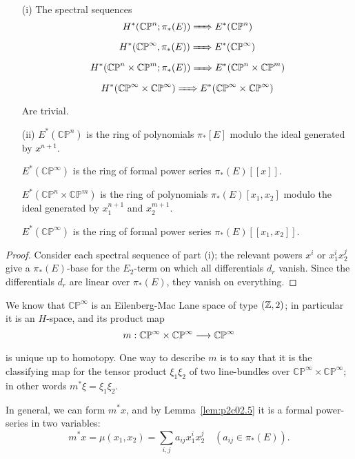 \documentclass[../main]{subfiles}
\begin{document}
\begin{customlemma}{2.5}
\label{lem:p2c02.5}
\begin{enumerate}
    \item[(i)] The spectral sequences \[H^\ast(\mathbb {CP}^n; \pi_\ast(E)) \xRightarrow{\phantom{.....}} E^\ast(\mathbb {CP}^n)\]
    \[H^\ast(\mathbb {CP}^\infty, \pi_\ast(E))  \xRightarrow{\phantom{.....}} E^\ast(\mathbb {CP}^\infty)\]
    \[H^\ast(\mathbb {CP}^n \times \mathbb {CP}^m; \pi_\ast(E))  \xRightarrow{\phantom{.....}} E^\ast(\mathbb {CP}^n \times \mathbb {CP}^m)\]
    \[H^\ast(\mathbb {CP}^\infty \times \mathbb {CP}^\infty)  \xRightarrow{\phantom{.....}} E^\ast(\mathbb {CP}^\infty \times \mathbb {CP}^\infty)\]
    Are trivial.
    \item[(ii)] $E^\ast(\mathbb {CP}^n)$ is the ring of polynomials $\pi_\ast[E]$ modulo the ideal generated by $x^{n + 1}$.
    
    $E^\ast(\mathbb {CP}^\infty)$ is the ring of formal power series $\pi_\ast(E)[[x]]$.
    
    $E^\ast(\mathbb {CP}^n \times \mathbb {CP}^m)$ is the ring of polynomials $\pi_\ast(E)[x_1, x_2]$ modulo the ideal generated by $x_1^{n + 1}$ and $x_2^{m + 1}$.
    
    $E^\ast(\mathbb {CP}^\infty)$ is the ring of formal power series $\pi_\ast(E)[[x_1, x_2]]$.
\end{enumerate}
\end{customlemma}

\begin{proof}
Consider each spectral sequence of part (i); the relevant powers $x^i$ or $x_1^i x_2^j$ give a $\pi_\ast(E)$-base for the $E_2$-term on which all differentials $d_r$ vanish. Since the differentials $d_r$ are linear over $\pi_\ast(E)$, they vanish on everything.
\end{proof}
We know that $\mathbb {CP}^\infty$ is an Eilenberg-Mac Lane space of type $(\mathbb{Z}, 2)$; in particular it is an $H$-space, and its product map \[m : \mathbb {CP}^\infty \times \mathbb {CP}^\infty \lar{} \mathbb {CP}^\infty\] is unique up to homotopy. One way to describe $m$ is to say that it is the classifying map for the tensor product $\xi_1 \xi_2$ of two line-bundles over $\mathbb {CP}^\infty \times \mathbb {CP}^\infty$; in other words $m^\ast \xi = \xi_1 \xi_2$. 


In general, we can form $m^\ast x$, and by Lemma~\ref{lem:p2c02.5} it is a formal power-series in two variables:
\begin{equation}
\tag{2.6}
\label{eqn:p2c02.6}
m^\ast x = \mu(x_1, x_2) = \sum_{i, j} a_{ij} x_1^i x_2^j \quad (a_{ij} \in \pi_\ast(E)).
\end{equation}
\end{document}
